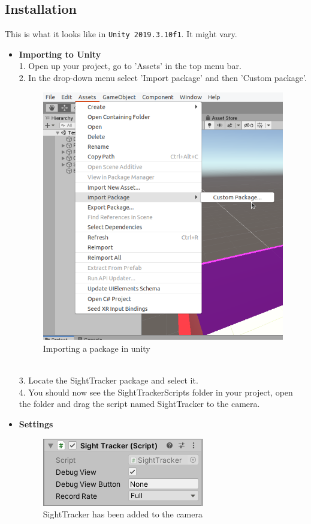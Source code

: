 \documentclass[letterpaper]{article}
\begin{document}
\subsection{Installation}
This is what it looks like in \texttt{Unity 2019.3.10f1}. It might vary.
\begin{itemize}
\item \textbf{Importing to Unity}\\
1. Open up your project, go to 'Assets' in the top menu bar.\\[0.15in]
2. In the drop-down menu select 'Import package' and then 'Custom package'.
\begin{figure}[h!]
  \centering \includegraphics[keepaspectratio,scale=0.8]{ImportPackage.png}
  \caption{Importing a package in unity}
  \label{fig:unityimport}
\end{figure}
\\3. Locate the SightTracker package and select it.\\[0.15in]
4. You should now see the SightTrackerScripts folder in your project, open the folder and drag the script named SightTracker to the camera.\\
\item \textbf{Settings}\\
\begin{figure}[h!]
  \centering \includegraphics[keepaspectratio,scale=0.9]{SightTracker.png}
  \caption{SightTracker has been added to the camera}
  \label{fig:loadedtocamera}
\end{figure}


\end{itemize}
\end{document}
